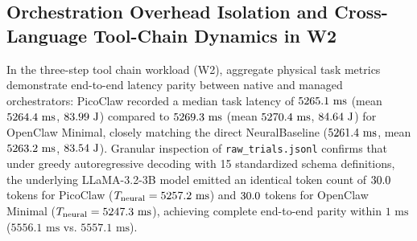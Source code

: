 \documentclass[11pt,a4paper]{article}
\begin{document}
\subsection{Orchestration Overhead Isolation and Cross-Language Tool-Chain Dynamics in W2}
In the three-step tool chain workload (W2), aggregate physical task metrics demonstrate end-to-end latency parity between native and managed orchestrators: PicoClaw recorded a median task latency of $5265.1\text{ ms}$ (mean $5264.4\text{ ms}$, $83.99\text{ J}$) compared to $5269.3\text{ ms}$ (mean $5270.4\text{ ms}$, $84.64\text{ J}$) for OpenClaw Minimal, closely matching the direct NeuralBaseline ($5261.4\text{ ms}$, mean $5263.2\text{ ms}$, $83.54\text{ J}$). Granular inspection of \texttt{raw\_trials.jsonl} confirms that under greedy autoregressive decoding with 15 standardized schema definitions, the underlying LLaMA-3.2-3B model emitted an identical token count of $30.0$ tokens for PicoClaw ($T_{\text{neural}} = 5257.2\text{ ms}$) and $30.0$ tokens for OpenClaw Minimal ($T_{\text{neural}} = 5247.3\text{ ms}$), achieving complete end-to-end parity within $1\text{ ms}$ ($5556.1\text{ ms}$ vs. $5557.1\text{ ms}$).
\end{document}

